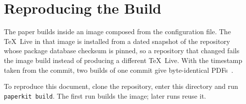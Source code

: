 \section{Reproducing the Build}

The paper builds inside an image composed from the configuration file. The
\TeX\ Live in that image is installed from a dated snapshot of the
repository~\cite{tlnet} whose package database checksum is pinned, so a
repository that changed fails the image build instead of producing a
different \TeX\ Live. With the timestamp taken from the commit, two builds of
one commit give byte-identical PDFs~\cite{reproducible}.

To reproduce this document, clone the repository, enter this directory and
run \texttt{paperkit build}. The first run builds the image; later runs reuse
it.

